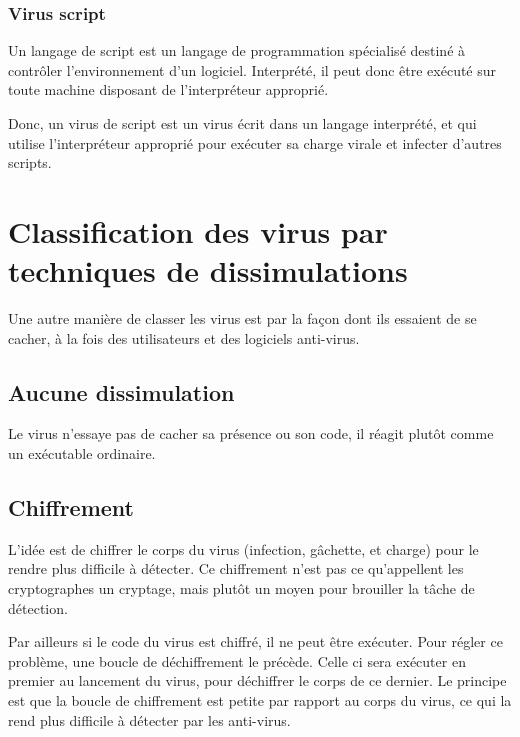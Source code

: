         \subsubsection{Virus script}
        Un langage de script est un langage de programmation spécialisé destiné à contrôler l'environnement 
        d'un logiciel. Interprété, il peut donc être exécuté sur toute machine disposant de l'interpréteur approprié. 
        \cite{virus_informatique_article} %

        Donc, un virus de script est un virus écrit dans un langage interprété, et qui utilise l'interpréteur approprié
        pour exécuter sa charge virale et infecter d'autres scripts. %

\section{Classification des virus par techniques de dissimulations}
Une autre manière de classer les virus est par la façon dont ils essaient de se cacher, 
à la fois des utilisateurs et des logiciels anti-virus. \cite{virus} %

    \subsection{Aucune dissimulation}
    Le virus n'essaye pas de cacher sa présence ou son code, il réagit plutôt comme un exécutable ordinaire. %

    \subsection{Chiffrement}
    L'idée est de chiffrer le corps du virus (infection, gâchette, et charge) pour le rendre plus difficile à 
    détecter. Ce chiffrement n'est pas ce qu'appellent les cryptographes un cryptage, mais plutôt un moyen pour
    brouiller la tâche de détection. \cite{virus} %

    Par ailleurs si le code du virus est chiffré, il ne peut être exécuter. Pour régler ce problème, une boucle 
    de déchiffrement le précède. Celle ci sera exécuter en premier au lancement du virus, pour déchiffrer le 
    corps de ce dernier. Le principe est que la boucle de chiffrement est petite par rapport au corps du virus, 
    ce qui la rend plus difficile à détecter par les anti-virus. \cite{virus} %

